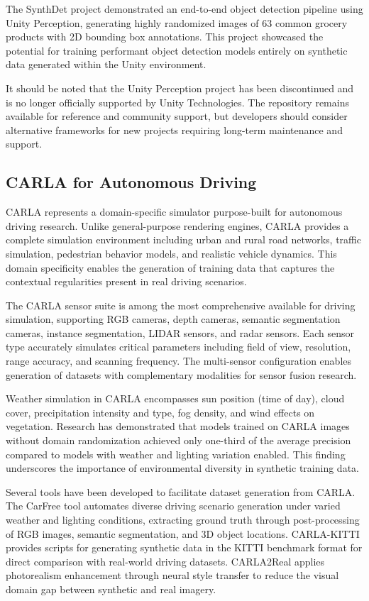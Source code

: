 The SynthDet project demonstrated an end-to-end object detection pipeline using Unity Perception, generating highly randomized images of 63 common grocery products with 2D bounding box annotations. This project showcased the potential for training performant object detection models entirely on synthetic data generated within the Unity environment.

It should be noted that the Unity Perception project has been discontinued and is no longer officially supported by Unity Technologies. The repository remains available for reference and community support, but developers should consider alternative frameworks for new projects requiring long-term maintenance and support.

\subsection{CARLA for Autonomous Driving}

CARLA represents a domain-specific simulator purpose-built for autonomous driving research. Unlike general-purpose rendering engines, CARLA provides a complete simulation environment including urban and rural road networks, traffic simulation, pedestrian behavior models, and realistic vehicle dynamics. This domain specificity enables the generation of training data that captures the contextual regularities present in real driving scenarios.

The CARLA sensor suite is among the most comprehensive available for driving simulation, supporting RGB cameras, depth cameras, semantic segmentation cameras, instance segmentation, LIDAR sensors, and radar sensors. Each sensor type accurately simulates critical parameters including field of view, resolution, range accuracy, and scanning frequency. The multi-sensor configuration enables generation of datasets with complementary modalities for sensor fusion research.

Weather simulation in CARLA encompasses sun position (time of day), cloud cover, precipitation intensity and type, fog density, and wind effects on vegetation. Research has demonstrated that models trained on CARLA images without domain randomization achieved only one-third of the average precision compared to models with weather and lighting variation enabled. This finding underscores the importance of environmental diversity in synthetic training data.

Several tools have been developed to facilitate dataset generation from CARLA. The CarFree tool automates diverse driving scenario generation under varied weather and lighting conditions, extracting ground truth through post-processing of RGB images, semantic segmentation, and 3D object locations. CARLA-KITTI provides scripts for generating synthetic data in the KITTI benchmark format for direct comparison with real-world driving datasets. CARLA2Real applies photorealism enhancement through neural style transfer to reduce the visual domain gap between synthetic and real imagery.


